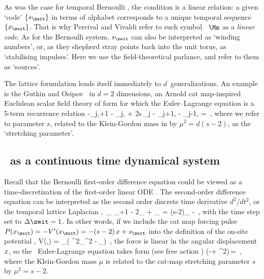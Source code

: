 As was the case for {temporal Bernoulli} , the condition
 is a linear relation: a given `code'
$\{\Ssym{\zeit}\}$ in terms of alphabet  corresponds
to a unique temporal sequence $\{\ssp_\zeit\}$. That is why Percival and
Vivaldi refer to such symbol \brick\ $\Mm$ as a {\em linear
code}. As for the Bernoulli system, $\Ssym{\zeit}$ can also be
interpreted as `winding numbers', or, as they shepherd
stray points back into the unit torus, as `stabilising
impulses'. Here we use the field-theoretical parlance,
and refer to them  as `sources'.

The lattice formulation  lends itself immediately to
$d$\dmn\ generalizations. An example is the Gutkin and
Osipov \catlatt\ in  $d=2$ dimensions, an Arnold
cat map-inspired Euclidean scalar field theory  of form
 for which the Euler–\-Lagrange equation
 is a 5-term recurrence relation
\beq
      -\ssp_{j,\zeit+1} - \ssp_{j,}
+ 2{s}\,\ssp_{j\zeit}
     - \ssp_{j+1,\zeit} - \ssp_{j-1, \zeit}
     =  
\,,
where we refer to parameter ${s}$, related to the Klein-Gordon mass in
 by ${\mu}^2=d({s}-2)$, as the `stretching
parameter'.


\subsection{\tempLatt\ as a continuous time dynamical system}
\label{s:tempCatODE}

Recall that the Bernoulli first-order difference equation could be viewed as
a time-discretization of the first-order linear ODE . The
second-order difference equation  can be interpreted as the
second order discrete time derivative ${d^2}/{dt^2}$, or the temporal
lattice Laplacian ,
\beq
\Box\,\ssp_\zeit \equiv
\ssp_{\zeit+1} - 2\ssp_{\zeit} + \ssp_{}
= (s-2)\ssp_{\zeit} -\Ssym{\zeit}
\,,
 with the time step set to $\Delta\zeit=1$.
In other words, if we include the cat map forcing pulse
\(
P(\ssp_\zeit)= - V'(\ssp_\zeit) = - (s-2)\,\ssp + \Ssym{\zeit}
\)
into the definition of
the on-site potential ,
\beq
V(\Xx,\Mm) = \sum_{\zeit\in\lattice}\left(
\mu^2\ssp_\zeit^2 -\Ssym{\zeit}\,\ssp_\zeit\right)
\,,
the force
is linear in the angular displacement $x$, so
the \templatt\ Euler-Lagrange equation takes form (see free action
)
\beq
(-\Box + {\mu}^2\id)\,\Xx = \Mm
\,,
where the Klein-Gordon mass ${\mu}$ is related to the cat-map
stretching parameter ${s}$ by ${\mu}^2={s}-2$.

